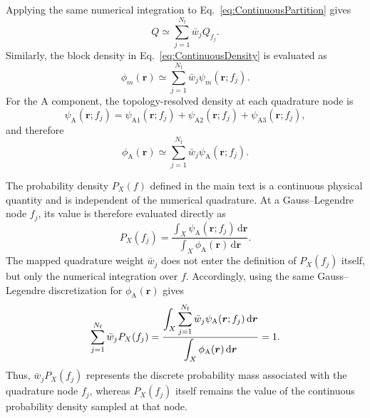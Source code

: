 \documentclass[journal=mamobx,manuscript=article]{achemso}
\begin{document}
	Applying the same numerical integration to Eq.~\eqref{eq:ContinuousPartition} gives
	\begin{equation}
		
			Q
			\simeq
			\sum_{j=1}^{N_{\mathrm f}}
			\bar w_j Q_{f_j}.
		
		\label{eq:QuadraturePartition}
	\end{equation}
	Similarly, the block density in Eq.~\eqref{eq:ContinuousDensity} is evaluated as
	\begin{equation}
		
			\phi_m(\bm r)
			\simeq
			\sum_{j=1}^{N_{\mathrm f}}
			\bar w_j \psi_m(\bm r;f_j).
		
		\label{eq:QuadratureDensity}
	\end{equation}
	For the A component, the topology-resolved density at each quadrature node is
	\begin{equation}
		\psi_{\mathrm A}(\bm r;f_j)
		=
		\psi_{\mathrm{A1}}(\bm r;f_j)
		+
		\psi_{\mathrm{A2}}(\bm r;f_j)
		+
		\psi_{\mathrm{A3}}(\bm r;f_j),
		\label{eq:QuadratureTopologyDensity}
	\end{equation}
	and therefore
	\begin{equation}
		
			\phi_{\mathrm A}(\bm r)
			\simeq
			\sum_{j=1}^{N_{\mathrm f}}
			\bar{w}_j \psi_{\mathrm A}(\bm r;f_j).
		
		\label{eq:QuadratureADensity}
	\end{equation}


	
	The probability density $P_X(f)$ defined in the main text is a continuous physical quantity and is independent of the numerical quadrature.
	At a Gauss--Legendre node $f_j$, its value is therefore evaluated directly as
	\begin{equation}
		P_X(f_j)
		=
		\frac{
			\displaystyle
			\int_X
			\psi_{\mathrm A}(\bm r;f_j)\,
			\mathrm d\bm r
		}{
			\displaystyle
			\int_X
			\phi_{\mathrm A}(\bm r)\,
			\mathrm d\bm r
		}.
		\label{eq:DiscreteProbability}
	\end{equation}
	The mapped quadrature weight $\bar w_j$ does not enter the definition of $P_X(f_j)$ itself, but only the numerical integration over $f$.
	Accordingly, using the same Gauss--Legendre discretization for $\phi_{\mathrm A}(\bm r)$ gives
	\begin{equation}
		\sum_{j=1}^{N_{\mathrm f}}
		\bar w_j P_X(f_j)
		=
		\frac{
			\displaystyle
			\int_X
			\sum_{j=1}^{N_{\mathrm f}}
			\bar w_j
			\psi_{\mathrm A}(\bm r;f_j)\,
			\mathrm d\bm r
		}{
			\displaystyle
			\int_X
			\phi_{\mathrm A}(\bm r)\,
			\mathrm d\bm r
		}
		\\
		= 1.
		\label{eq:ProbabilityNorm}
	\end{equation}
	Thus, $\bar w_jP_X(f_j)$ represents the discrete probability mass associated with the quadrature node $f_j$, whereas $P_X(f_j)$ itself remains the value of the continuous probability density sampled at that node.
	
\end{document}
